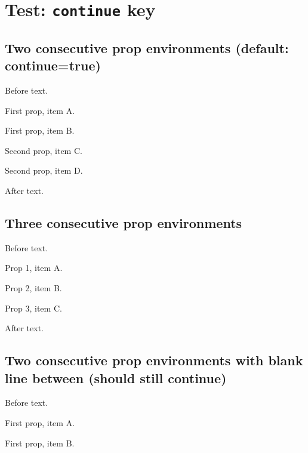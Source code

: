 \documentclass{article}
\begin{document}
\section{Test: \texttt{continue} key}

\subsection{Two consecutive prop environments (default: continue=true)}

Before text.

\begin{prop}
  \item First prop, item A.
  \item First prop, item B.
\end{prop}

\begin{prop}
  \item Second prop, item C.
  \item Second prop, item D.
\end{prop}

After text.

\subsection{Three consecutive prop environments}

Before text.

\begin{prop}
  \item Prop 1, item A.
\end{prop}

\begin{prop}
  \item Prop 2, item B.
\end{prop}

\begin{prop}
  \item Prop 3, item C.
\end{prop}

After text.

\subsection{Two consecutive prop environments with blank line between (should still continue)}

Before text.

\begin{prop}
  \item First prop, item A.
  \item First prop, item B.
\end{prop}
\end{document}

